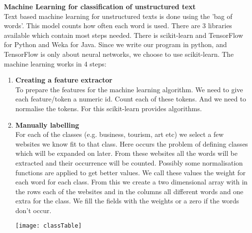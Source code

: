 \textbf{Machine Learning for classification of unstructured text}\\
Text based machine learning for unstructured texts is done using the 'bag of words'. This model counts how often each word is used. There are 3 libraries available which contain most steps needed. There is scikit-learn \cite{scikit-learn} and TensorFlow \cite{tensorFlow} for Python and Weka \cite{weka} for Java. Since we write our program in python, and TensorFlow is only about neural networks, we choose to use scikit-learn.
The machine learning works in 4 steps:
\begin{enumerate}
    \item \textbf{Creating a feature extractor} \\
    To prepare the features for the machine learning algorithm. We need to give each feature/token a numeric id. Count each of these tokens. And we need to normalise the tokens. For this scikit-learn provides algorithms.
    
    \item \textbf{Manually labelling} \\
    For each of the classes (e.g. business, tourism, art etc) we select a few websites we know fit to that class. Here occurs the problem of defining classes which will be expanded on later. From these websites all the words will be extracted and their occurrence will be counted. Possibly some normalisation functions are applied to get better values. We call these values the weight for each word for each class. From this we create a two dimensional array with in the rows each of the websites and in the columns all different words and one extra for the class. We fill the fields with the weights or a zero if the words don't occur.
    
    \texttt{[image: classTable]}
    

\end{enumerate}
